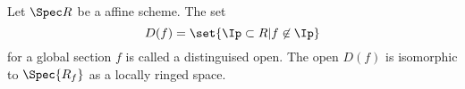 \begin{definition}
Let $\Spec R$ be a affine scheme.
The set \[D(f)=\set{\Ip \subset R | f\not\in\Ip}\] for a global section $f$ is called a distinguised open.
The open $D(f)$ is isomorphic to $\Spec{R_f}$ as a locally ringed space.%
\end{definition}
